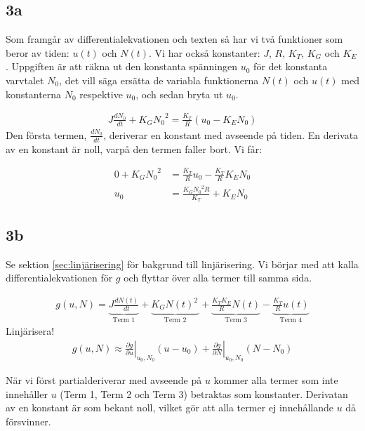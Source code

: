 \documentclass[a4paper]{article}
\begin{document}
\subsection{3a}
Som framgår av differentialekvationen och texten så har vi två funktioner som beror av tiden: $u(t)$ och $N(t)$. Vi har också konstanter: $J$, $R$, $K_T$, $K_G$ och $K_E$. Uppgiften är att räkna ut den konstanta spänningen $u_0$ för det konstanta varvtalet $N_0$, det vill säga ersätta de variabla funktionerna $N(t)$ och $u(t)$ med konstanterna $N_0$ respektive $u_0$, och sedan bryta ut $u_0$.

\begin{align*}
  J \frac{dN_0}{dt} + K_G{N_0}^2 = \frac{K_T}{R}(u_0 - K_EN_0)
\end{align*}
%
Den första termen, $\frac{dN_0}{dt}$, deriverar en konstant med avseende på tiden. En derivata av en konstant är noll, varpå den termen faller bort. Vi får:

\begin{align*}
  0 + K_G{N_0}^2 &= \frac{K_T}{R}u_0 - \frac{K_T}{R}K_EN_0\\
  u_0 &= \frac{K_G{N_0}^2R}{K_T} + K_EN_0
\end{align*}
%


\subsection{3b}
Se sektion \ref{sec:linjärisering} för bakgrund till linjärisering. Vi börjar med att kalla differentialekvationen för $g$ och flyttar över alla termer till samma sida.

\begin{align*}
  g(u, N) = \underbrace{J \frac{dN(t)}{dt}}_{\text{Term 1}} + \underbrace{K_G{N(t)}^2\frac{ }{ }}_{\text{Term 2}} + \underbrace{\frac{K_T K_E}{R} N(t)}_{\text{Term 3}} - \underbrace{\frac{K_T}{R}u(t)}_{\text{Term 4}}
\end{align*}
Linjärisera!
\begin{align*}
  g(u, N) \approx \left. \frac{\partial g}{\partial u}\right|_{u_0, N_0}(u - u_0) + \left. \frac{\partial g}{\partial N}\right|_{u_0, N_0}(N - N_0)
\end{align*}

När vi först partialderiverar med avseende på $u$ kommer alla termer som inte innehåller $u$ (Term 1, Term 2 och Term 3) betraktas som konstanter. Derivatan av en konstant är som bekant noll, vilket gör att alla termer ej innehållande $u$ då försvinner.
\end{document}
